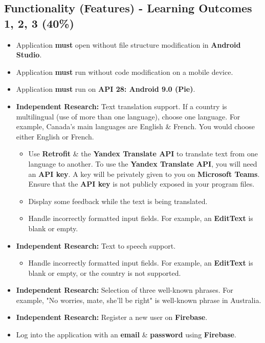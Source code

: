 \documentclass{article}
\begin{document}
\subsection*{Functionality (Features) - Learning Outcomes 1, 2, 3 (40\%)}
\begin{itemize}
	\item Application \textbf{must} open without file structure modification in \textbf{Android Studio}.
	\item Application \textbf{must} run without code modification on a mobile device.
	\item Application \textbf{must} run on \textbf{API 28: Android 9.0 (Pie)}.
	\item \textbf{Independent Research:} Text translation support. If a country is multilingual (use of more than one language), choose one language. For example, Canada's main languages are English \& French. You would choose either English or French.
	      \begin{itemize}
	      	\item Use \textbf{Retrofit} \& the \textbf{Yandex Translate API} to translate text from one language to another. To use the \textbf{Yandex Translate API}, you will need an \textbf{API key}. A key will be privately given to you on \textbf{Microsoft Teams}. Ensure that the \textbf{API key} is not publicly exposed in your program files.
	      	\item Display some feedback while the text is being translated.
	      	\item Handle incorrectly formatted input fields. For example, an \textbf{EditText} is blank or empty.
	      \end{itemize}
	\item \textbf{Independent Research:} Text to speech support.
	      \begin{itemize}
	      	\item Handle incorrectly formatted input fields. For example, an \textbf{EditText} is blank or empty, or the country is not supported.
	      \end{itemize}
	\item \textbf{Independent Research:} Selection of three well-known phrases. For example, "No worries, mate, she'll be right" is well-known phrase in Australia.
	\item \textbf{Independent Research:} Register a new user on \textbf{Firebase}.
	\item Log into the application with an \textbf{email} \& \textbf{password} using \textbf{Firebase}.

\end{itemize}
\end{document}
